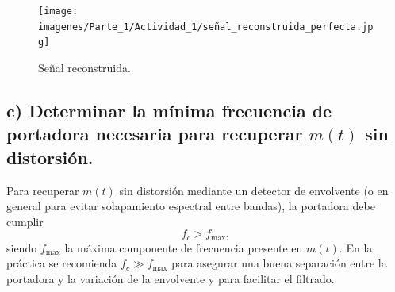     \begin{figure}[H]
        \centering
        \texttt{[image: imagenes/Parte\_1/Actividad\_1/señal\_reconstruida\_perfecta.jpg]}
        \caption{Señal reconstruida.}
        \label{fig:señal_reconstruida_perfecta}
    \end{figure}
        

\subsection*{c) Determinar la mínima frecuencia de portadora necesaria para recuperar $m(t)$ sin distorsión.}  


    Para recuperar $m(t)$ sin distorsión mediante un detector de envolvente (o en general para evitar solapamiento espectral entre bandas), la portadora debe cumplir
    \[
    f_c>f_{\max},
    \]
    siendo $f_{\max}$ la máxima componente de frecuencia presente en $m(t)$. En la práctica se recomienda $f_c\gg f_{\max}$ para asegurar una buena separación entre la portadora y la variación de la envolvente y para facilitar el filtrado.

    
